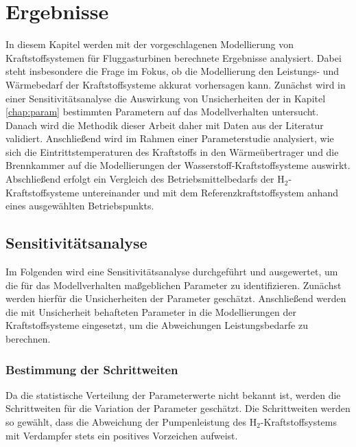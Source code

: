 \chapter{Ergebnisse} \label{chap:ergebnis}

In diesem Kapitel werden mit der vorgeschlagenen Modellierung von Kraftstoffsystemen für Fluggasturbinen berechnete Ergebnisse analysiert. Dabei steht insbesondere die Frage im Fokus, ob die Modellierung den Leistungs- und Wärmebedarf der Kraftstoffsysteme akkurat vorhersagen kann. Zunächst wird in einer Sensitivitätsanalyse die Auswirkung von Unsicherheiten der in Kapitel \ref{chap:param} bestimmten Parametern auf das Modellverhalten untersucht. Danach wird die Methodik dieser Arbeit daher mit Daten aus der Literatur validiert. Anschließend wird im Rahmen einer Parameterstudie analysiert, wie sich die Eintrittstemperaturen des Kraftstoffs in den Wärmeübertrager und die Brennkammer auf die Modellierungen der Wasserstoff-Kraftstoffsysteme auswirkt. Abschließend erfolgt ein Vergleich des Betriebsmittelbedarfs der H$_2$-Kraftstoffsysteme untereinander und mit dem Referenzkraftstoffsystem anhand eines ausgewählten Betriebspunkts.

\section{Sensitivitätsanalyse}

Im Folgenden wird eine Sensitivitätsanalyse durchgeführt und ausgewertet, um die für das Modellverhalten maßgeblichen Parameter zu identifizieren. Zunächst werden hierfür die Unsicherheiten der Parameter geschätzt. Anschließend werden die mit Unsicherheit behafteten Parameter in die Modellierungen der Kraftstoffsysteme eingesetzt, um die Abweichungen Leistungsbedarfe zu berechnen.

\subsection{Bestimmung der Schrittweiten}

Da die statistische Verteilung der Parameterwerte nicht bekannt ist, werden die Schrittweiten für die Variation der Parameter geschätzt. Die Schrittweiten werden so gewählt, dass die Abweichung der Pumpenleistung des H$_2$-Kraftstoffsystems mit Verdampfer stets ein positives Vorzeichen aufweist.

